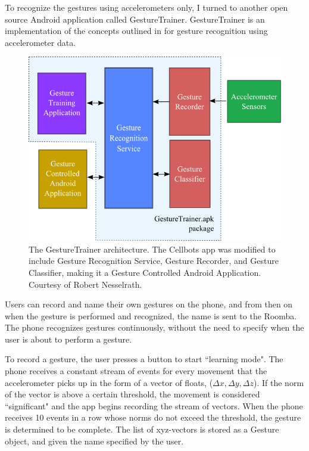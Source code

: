 \documentclass[12pt, letterpaper]{report}
\begin{document}
To recognize the gestures using accelerometers only, I turned to another open source Android application called GestureTrainer. GestureTrainer is an implementation of the concepts outlined in \cite{TaKG} for gesture recognition using accelerometer data.

\begin{figure}[h]
	\centering
	\includegraphics[width=\textwidth]{images/gesture_framework}
	\caption{The GestureTrainer architecture. The Cellbots app was modified to include Gesture Recognition Service, Gesture Recorder, and Gesture Classifier, making it a Gesture Controlled Android Application. Courtesy of Robert Nesselrath\cite{gesture_diagram}.}
	\label{gesture_framework}
\end{figure}

Users can record and name their own gestures on the phone, and from then on when the gesture is performed and recognized, the name is sent to the Roomba. The phone recognizes gestures continuously, without the need to specify when the user is about to perform a gesture.

To record a gesture, the user presses a button to start ``learning mode". The phone receives a constant stream of events for every movement that the accelerometer picks up in the form of a vector of floats, ($\Delta x, \Delta y, \Delta z$). If the norm of the vector is above a certain threshold, the movement is considered ``significant" and the app begins recording the stream of vectors. When the phone receives 10 events in a row whose norms do not exceed the threshold, the gesture is determined to be complete. The list of xyz-vectors is stored as a Gesture object, and given the name specified by the user. 
\end{document}
